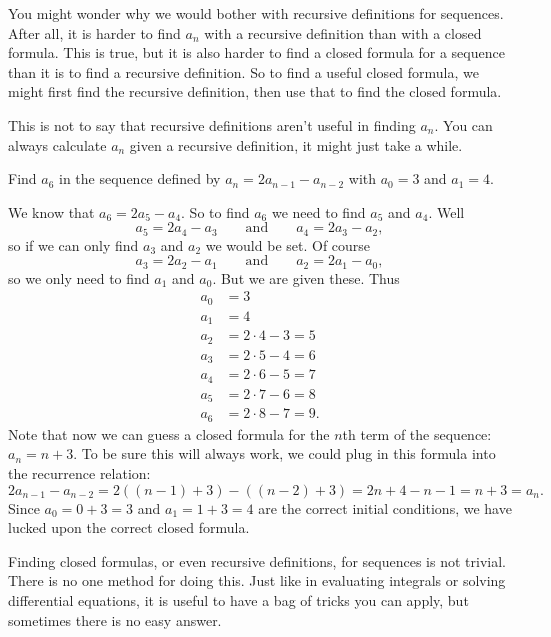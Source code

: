 \documentclass[12pt]{article}
\begin{document}
You might wonder why we would bother with recursive definitions for sequences.  After all, it is harder to find $a_n$ with a recursive definition than with a closed formula.  This is true, but it is also harder to find a closed formula for a sequence than it is to find a recursive definition.  So to find a useful closed formula, we might first find the recursive definition, then use that to find the closed formula.

This is not to say that recursive definitions aren't useful in finding $a_n$.  You can always calculate $a_n$ given a recursive definition, it might just take a while.

\begin{example}
 Find $a_6$ in the sequence defined by $a_n = 2a_{n-1} - a_{n-2}$ with $a_0 = 3$ and $a_1 = 4$.
 \begin{solution}
  We know that $a_6 = 2a_5 - a_4$.  So to find $a_6$ we need to find $a_5$ and $a_4$.  Well \[a_5 = 2a_4 - a_3 \qquad \mbox{and} \qquad a_4 = 2a_3 - a_2,\]
  so if we can only find $a_3$ and $a_2$ we would be set.  Of course
  \[a_3 = 2a_2 - a_1 \qquad \mbox{and} \qquad a_2 = 2a_1 - a_0,\]
  so we only need to find $a_1$ and $a_0$.  But we are given these.  Thus
  \begin{align*}
   a_0 & = 3 \\
   a_1 & = 4 \\
   a_2 & = 2\cdot 4 - 3 = 5\\
   a_3 & = 2\cdot 5 - 4 = 6\\
   a_4 & = 2\cdot 6 - 5 = 7\\
   a_5 & = 2\cdot 7 - 6 = 8\\
   a_6 & = 2\cdot 8 - 7 = 9.
  \end{align*}
 Note that now we can guess a closed formula for the $n$th term of the sequence: $a_n = n+3$.  To be sure this will always work, we could plug in this formula into the recurrence relation: \[2a_{n-1} - a_{n-2} = 2((n-1) + 3) - ((n-2) + 3) = 2n + 4 - n - 1 = n + 3 = a_n.\]
 Since $a_0 = 0 + 3 = 3$ and $a_1 = 1+3 = 4$ are the correct initial conditions, we have lucked upon the correct closed formula.
 \end{solution}

\end{example}


Finding closed formulas, or even recursive definitions, for sequences is not trivial. There is no one method for doing this.  Just like in evaluating integrals or solving differential equations, it is useful to have a bag of tricks you can apply, but sometimes there is no easy answer.
\end{document}

